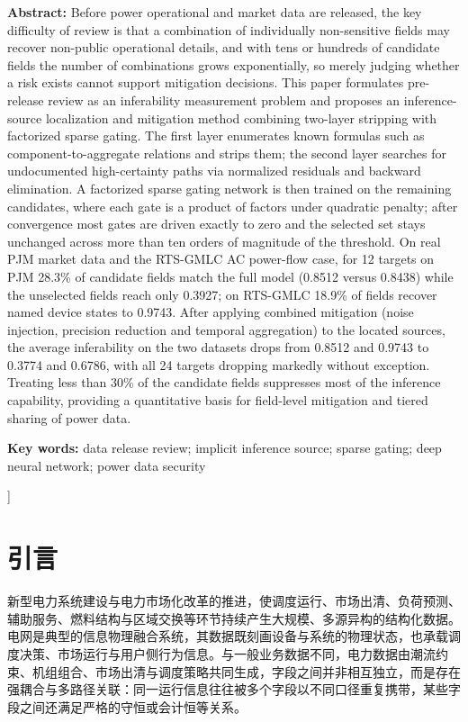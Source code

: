 \documentclass[UTF8,zihao=5,twoside]{ctexart}
\begin{document}
\noindent\textbf{Abstract:} Before power operational and market data are released, the key difficulty of review is that a combination of individually non-sensitive fields may recover non-public operational details, and with tens or hundreds of candidate fields the number of combinations grows exponentially, so merely judging whether a risk exists cannot support mitigation decisions. This paper formulates pre-release review as an inferability measurement problem and proposes an inference-source localization and mitigation method combining two-layer stripping with factorized sparse gating. The first layer enumerates known formulas such as component-to-aggregate relations and strips them; the second layer searches for undocumented high-certainty paths via normalized residuals and backward elimination. A factorized sparse gating network is then trained on the remaining candidates, where each gate is a product of factors under quadratic penalty; after convergence most gates are driven exactly to zero and the selected set stays unchanged across more than ten orders of magnitude of the threshold. On real PJM market data and the RTS-GMLC AC power-flow case, for 12 targets on PJM 28.3\% of candidate fields match the full model (0.8512 versus 0.8438) while the unselected fields reach only 0.3927; on RTS-GMLC 18.9\% of fields recover named device states to 0.9743. After applying combined mitigation (noise injection, precision reduction and temporal aggregation) to the located sources, the average inferability on the two datasets drops from 0.8512 and 0.9743 to 0.3774 and 0.6786, with all 24 targets dropping markedly without exception. Treating less than 30\% of the candidate fields suppresses most of the inference capability, providing a quantitative basis for field-level mitigation and tiered sharing of power data.\par
\noindent\textbf{Key words:} data release review; implicit inference source; sparse gating; deep neural network; power data security\par\vspace{0.8em}

\vspace{0.8em}
]

\section{引言}

新型电力系统建设与电力市场化改革的推进，使调度运行、市场出清、负荷预测、辅助服务、燃料结构与区域交换等环节持续产生大规模、多源异构的结构化数据\cite{ref-liu-cps,ref-ma-pjm}。电网是典型的信息物理融合系统，其数据既刻画设备与系统的物理状态，也承载调度决策、市场运行与用户侧行为信息。与一般业务数据不同，电力数据由潮流约束、机组组合、市场出清与调度策略共同生成，字段之间并非相互独立，而是存在强耦合与多路径关联：同一运行信息往往被多个字段以不同口径重复携带，某些字段之间还满足严格的守恒或会计恒等关系。
\end{document}
